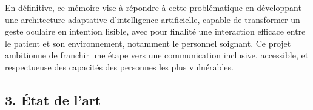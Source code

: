 \documentclass[
]{article}
\begin{document}
En définitive, ce mémoire vise à répondre à cette problématique en développant une architecture adaptative d'intelligence artificielle, capable de transformer un geste oculaire en intention lisible, avec pour finalité une interaction efficace entre le patient et son environnement, notamment le personnel soignant. Ce projet ambitionne de franchir une étape vers une communication inclusive, accessible, et respectueuse des capacités des personnes les plus vulnérables.

\hypertarget{section-36}{%
\subsection{}\label{section-36}}

\hypertarget{section-37}{%
\subsection{}\label{section-37}}

\hypertarget{section-38}{%
\subsection{}\label{section-38}}

\hypertarget{section-39}{%
\subsection{}\label{section-39}}

\hypertarget{section-40}{%
\subsection{}\label{section-40}}

\hypertarget{section-41}{%
\subsection{}\label{section-41}}

\hypertarget{section-42}{%
\subsection{}\label{section-42}}

\hypertarget{section-43}{%
\subsection{}\label{section-43}}

\hypertarget{uxe9tat-de-lart}{%
\subsection{3. État de l'art}\label{uxe9tat-de-lart}}
\end{document}
